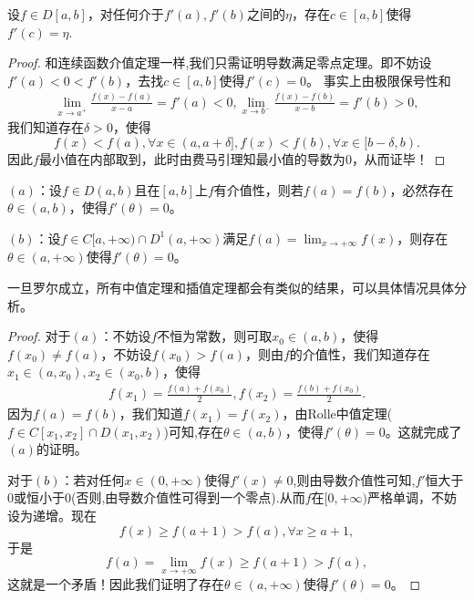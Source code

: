 \documentclass[../../main.tex]{subfiles}
\begin{document}
\begin{theorem}\label{theorem:导数介值定理}
设\(f \in D[a,b]\)，对任何介于\(f'(a),f'(b)\)之间的\(\eta\)，存在\(c \in [a,b]\)使得\(f'(c)=\eta\).
\end{theorem}
\begin{proof}
和连续函数介值定理一样,我们只需证明导数满足零点定理。即不妨设\(f'(a) < 0 < f'(b)\)，去找\(c \in [a,b]\)使得\(f'(c)=0\)。
事实上由极限保号性和
\begin{align*}
\lim_{x \to a^{+}}\frac{f(x)-f(a)}{x - a}=f'(a)<0,\lim_{x \to b^{-}}\frac{f(x)-f(b)}{x - b}=f'(b)>0,
\end{align*}
我们知道存在\(\delta>0\)，使得
\[f(x)<f(a),\forall x \in (a,a + \delta],f(x)<f(b),\forall x \in [b - \delta,b).\]
因此\(f\)最小值在内部取到，此时由费马引理知最小值的导数为\(0\)，从而证毕！
\end{proof}

\begin{theorem}[加强的Rolle中值定理]\label{theorem:加强的Rolle中值定理}
\((a)\)：设\(f \in D(a,b)\)且在\([a,b]\)上\(f\)有介值性，则若\(f(a)=f(b)\)，必然存在\(\theta \in (a,b)\)，使得\(f'(\theta)=0\)。

\((b)\)：设\(f \in C[a,+\infty)\cap D^{1}(a,+\infty)\)满足\(f(a)=\lim_{x \to +\infty}f(x)\)，则存在\(\theta \in (a,+\infty)\)使得\(f'(\theta)=0\)。
\end{theorem}
\begin{note}
一旦罗尔成立，所有中值定理和插值定理都会有类似的结果，可以具体情况具体分析。
\end{note}
\begin{proof}
对于\((a)\)：不妨设\(f\)不恒为常数，则可取\(x_0 \in (a,b)\)，使得\(f(x_0)\neq f(a)\)，不妨设\(f(x_0)>f(a)\)，则由\(f\)的介值性，我们知道存在\(x_1 \in (a,x_0),x_2 \in (x_0,b)\)，使得
\begin{align*}
f(x_1)=\frac{f(a)+f(x_0)}{2},f(x_2)=\frac{f(b)+f(x_0)}{2}.
\end{align*}
因为\(f(a)=f(b)\)，我们知道\(f(x_1)=f(x_2)\)，由Rolle中值定理($f\in C[x_1,x_2]\cap D(x_1,x_2)$)可知,存在\(\theta \in (a,b)\)，使得\(f'(\theta)=0\)。这就完成了\((a)\)的证明。

对于\((b)\)：若对任何\(x \in (0,+\infty)\)使得\(f'(x)\neq 0\),则由导数介值性可知,$f'$恒大于0或恒小于0(否则,由导数介值性可得到一个零点).从而\(f\)在\([0,+\infty)\)严格单调，不妨设为递增。现在
\[f(x)\geqslant f(a + 1)>f(a),\forall x\geqslant a + 1,\]
于是
\[f(a)=\lim_{x \to +\infty}f(x)\geqslant f(a + 1)>f(a),\]
这就是一个矛盾！因此我们证明了存在\(\theta \in (a,+\infty)\)使得\(f'(\theta)=0\)。    
\end{proof}
\end{document}
